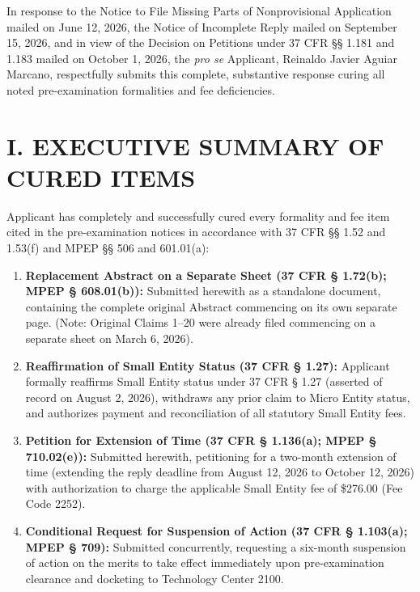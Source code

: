 \documentclass[11pt,letterpaper]{article}
\begin{document}
\noindent In response to the Notice to File Missing Parts of Nonprovisional Application mailed on June 12, 2026, the Notice of Incomplete Reply mailed on September 15, 2026, and in view of the Decision on Petitions under 37 CFR \S\S{} 1.181 and 1.183 mailed on October 1, 2026, the \textit{pro se} Applicant, Reinaldo Javier Aguiar Marcano, respectfully submits this complete, substantive response curing all noted pre-examination formalities and fee deficiencies.

\section*{I. EXECUTIVE SUMMARY OF CURED ITEMS}

Applicant has completely and successfully cured every formality and fee item cited in the pre-examination notices in accordance with 37 CFR \S\S{} 1.52 and 1.53(f) and MPEP \S\S{} 506 and 601.01(a):

\begin{enumerate}[leftmargin=2em, itemsep=3pt, parsep=0pt]
    \item \textbf{Replacement Abstract on a Separate Sheet (37 CFR \S{} 1.72(b); MPEP \S{} 608.01(b)):} Submitted herewith as a standalone document, containing the complete original Abstract commencing on its own separate page. (Note: Original Claims 1--20 were already filed commencing on a separate sheet on March 6, 2026).
    \item \textbf{Reaffirmation of Small Entity Status (37 CFR \S{} 1.27):} Applicant formally reaffirms Small Entity status under 37 CFR \S{} 1.27 (asserted of record on August 2, 2026), withdraws any prior claim to Micro Entity status, and authorizes payment and reconciliation of all statutory Small Entity fees.
    \item \textbf{Petition for Extension of Time (37 CFR \S{} 1.136(a); MPEP \S{} 710.02(e)):} Submitted herewith, petitioning for a two-month extension of time (extending the reply deadline from August 12, 2026 to October 12, 2026) with authorization to charge the applicable Small Entity fee of \$276.00 (Fee Code 2252).
    \item \textbf{Conditional Request for Suspension of Action (37 CFR \S{} 1.103(a); MPEP \S{} 709):} Submitted concurrently, requesting a six-month suspension of action on the merits to take effect immediately upon pre-examination clearance and docketing to Technology Center 2100.
\end{enumerate}

\newpage
\end{document}
